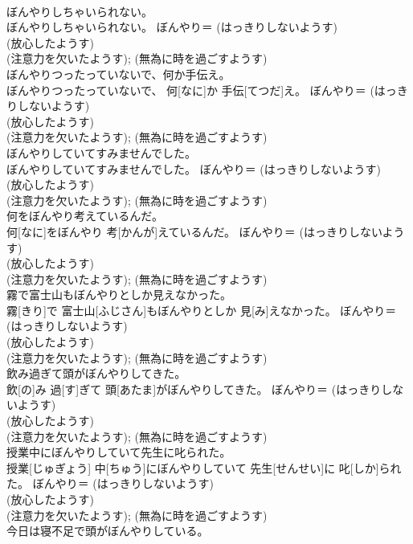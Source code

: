 \documentclass[8pt]{extreport}
\begin{document}
\begin{CJK}{UTF8}{min}
{\\	ぼんやりしちゃいられない。	
\\	ぼんやりしちゃいられない。	ぼんやり＝ (はっきりしないようす) 
\\	(放心したようす) 
\\	(注意力を欠いたようす); (無為に時を過ごすようす) 
\\	ぼんやりつったっていないで、何か手伝え。	
\\	ぼんやりつったっていないで、 何[なに]か 手伝[てつだ]え。	ぼんやり＝ (はっきりしないようす) 
\\	(放心したようす) 
\\	(注意力を欠いたようす); (無為に時を過ごすようす) 
\\	ぼんやりしていてすみませんでした。	
\\	ぼんやりしていてすみませんでした。	ぼんやり＝ (はっきりしないようす) 
\\	(放心したようす) 
\\	(注意力を欠いたようす); (無為に時を過ごすようす) 
\\	何をぼんやり考えているんだ。	
\\	何[なに]をぼんやり 考[かんが]えているんだ。	ぼんやり＝ (はっきりしないようす) 
\\	(放心したようす) 
\\	(注意力を欠いたようす); (無為に時を過ごすようす) 
\\	霧で富士山もぼんやりとしか見えなかった。	
\\	霧[きり]で 富士山[ふじさん]もぼんやりとしか 見[み]えなかった。	ぼんやり＝ (はっきりしないようす) 
\\	(放心したようす) 
\\	(注意力を欠いたようす); (無為に時を過ごすようす) 
\\	飲み過ぎて頭がぼんやりしてきた。	
\\	飲[の]み 過[す]ぎて 頭[あたま]がぼんやりしてきた。	ぼんやり＝ (はっきりしないようす) 
\\	(放心したようす) 
\\	(注意力を欠いたようす); (無為に時を過ごすようす) 
\\	授業中にぼんやりしていて先生に叱られた。	
\\	授業[じゅぎょう] 中[ちゅう]にぼんやりしていて 先生[せんせい]に 叱[しか]られた。	ぼんやり＝ (はっきりしないようす) 
\\	(放心したようす) 
\\	(注意力を欠いたようす); (無為に時を過ごすようす) 
\\	今日は寝不足で頭がぼんやりしている。	
}
\end{CJK}
\end{document}
